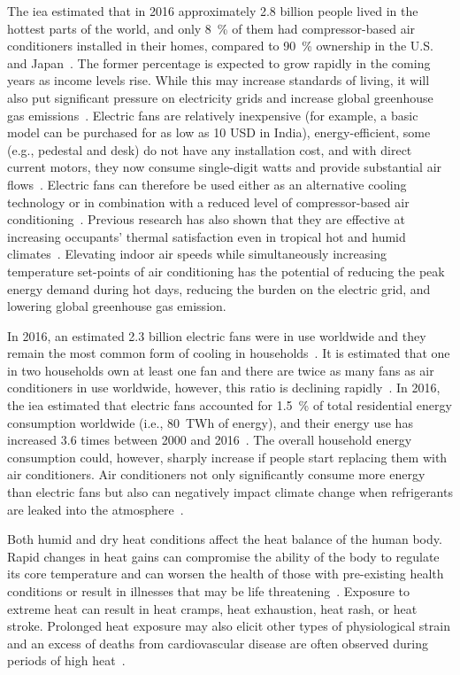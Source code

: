 The \ac{iea} estimated that in 2016 approximately 2.8 billion people lived in the hottest parts of the world, and only 8~\% of them had compressor-based air conditioners installed in their homes, compared to 90~\% ownership in the U.S. and Japan~\cite{IEA2018}.
The former percentage is expected to grow rapidly in the coming years as income levels rise.
While this may increase standards of living, it will also put significant pressure on electricity grids and increase global greenhouse gas emissions~\cite{IEA2018}.
Electric fans are relatively inexpensive (for example, a basic model can be purchased for as low as 10 USD in India), energy-efficient, some (e.g., pedestal and desk) do not have any installation cost, and with direct current motors, they now consume single-digit watts and provide substantial air flows~\cite{Yang2015a}.
Electric fans can therefore be used either as an alternative cooling technology or in combination with a reduced level of compressor-based air conditioning~\cite{Jay2019a, Hoyt2015, Schiavon2008}.
Previous research has also shown that they are effective at increasing occupants' thermal satisfaction even in tropical hot and humid climates~\cite{Lipczynska2018a}.
Elevating indoor air speeds while simultaneously increasing temperature set-points of air conditioning has the potential of reducing the peak energy demand during hot days, reducing the burden on the electric grid, and lowering global greenhouse gas emission.

In 2016, an estimated 2.3 billion electric fans were in use worldwide and they remain the most common form of cooling in households~\cite{IEA2018}.
It is estimated that one in two households own at least one fan and there are twice as many fans as air conditioners in use worldwide, however, this ratio is declining rapidly~\cite{IEA2018}.
In 2016, the \ac{iea} estimated that electric fans accounted for 1.5~\% of total residential energy consumption worldwide (i.e., 80~TWh of energy), and their energy use has increased 3.6 times between 2000 and 2016~\cite{IEA2018}.
The overall household energy consumption could, however, sharply increase if people start replacing them with air conditioners.
Air conditioners not only significantly consume more energy than electric fans but also can negatively impact climate change when refrigerants are leaked into the atmosphere~\cite{IEA2018}.

Both humid and dry heat conditions affect the heat balance of the human body.
Rapid changes in heat gains can compromise the ability of the body to regulate its core temperature and can worsen the health of those with pre-existing health conditions or result in illnesses that may be life threatening~\cite{WMO2015}.
Exposure to extreme heat can result in heat cramps, heat exhaustion, heat rash, or heat stroke.
Prolonged heat exposure may also elicit other types of physiological strain and an excess of deaths from cardiovascular disease are often observed during periods of high heat~\cite{Semenza1996}.

